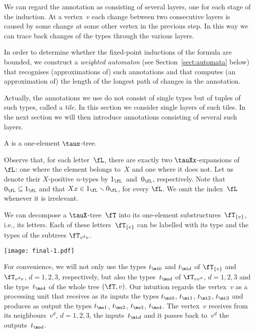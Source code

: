 \documentclass{LMCS}
\begin{document}
We can regard the annotation as consisting of several layers, one for each stage of the
induction. At a vertex~$v$ each change between two consecutive layers is caused
by some change at some other vertex in the previous step. In this way we can trace
back changes of the types through the various layers.

In order to determine whether the fixed-point inductions of the formula are bounded,
we construct a \emph{weighted automaton} (see Section~\ref{sect:automata} below)
that recognises (approximations of) such annotations and that computes
(an approximation of) the length of the longest path of changes in the annotation.

Actually, the annotations we use do not consist of single types but
of tuples of such types, called a \emph{tile.}
In this section we consider single layers of such tiles.
In the next section we will then introduce annotations
consisting of several such layers.

\begin{defi}
A  is a one-element $\taux$-tree.
\end{defi}
Observe that, for each letter~$\fL$,
there are exactly two $\tauXx$-expansions of~$\fL$\?:
one where the element belongs to~$X$ and one where it does not.
Let us denote their $X$-positive $n$-types
by $1_\fL$~and~$0_\fL$, respectively.
Note that $0_\fL \subseteq 1_\fL$ and that $Xx\in 1_\fL \smallsetminus 0_\fL$,
for every $\fL$. We omit the index~$\fL$ whenever it is irrelevant.

We can decompose a $\tauX$-tree~$\fT$ into its one-element
substructures~$\fT_{\{v\}}$, i.e., its letters.
Each of these letters~$\fT_{\{v\}}$ can be labelled with
its type and the types of the subtrees $\fT_{v^dv}$.
\begin{center}
\texttt{[image: final-1.pdf]}
\end{center}
For convenience, we will not only use the types $t_{\mi0}$ and $t_{\mi d}$
of $\fT_{\{v\}}$ and $\fT_{v^dv}$, $d = 1,2,3$, respectively,
but also the types~$t_{\mo d}$ of $\fT_{vv^d}$, $d = 1,2,3$
and the type~$t_{\mo4}$ of the whole tree $(\fT,v)$.
Our intuition regards the vertex~$v$ as a processing unit
that receives as its inputs the types $t_{\mi 0}$, $t_{\mi 1}$, $t_{\mi 2}$, $t_{\mi 3}$
and produces as output the types $t_{\mo 1}$, $t_{\mo 2}$, $t_{\mo 3}$, $t_{\mo 4}$.
The vertex~$v$ receives from its neighbours~$v^d$, $d = 1,2,3$,
the inputs~$t_{\mi d}$ and it passes back to~$v^d$ the outputs~$t_{\mo d}$.
\end{document}
